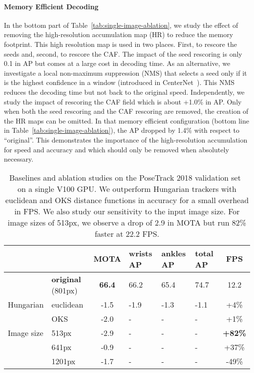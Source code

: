 \documentclass[journal]{IEEEtran}
\begin{document}
\paragraph{Memory Efficient Decoding}
In the bottom part of Table~\ref{tab:single-image-ablation}, we study
the effect of removing the high-resolution accumulation map (HR)
to reduce the memory footprint.
This high resolution map is used in two places. First, to rescore the seeds
and, second, to rescore the CAF. The impact of the seed rescoring
is only 0.1 in AP but comes at a large cost in decoding time.
As an alternative, we investigate a local non-maximum suppression (NMS)
that selects a seed only if it is the highest confidence in a 
window (introduced in CenterNet~\cite{zhou2019objects}). This NMS reduces
the decoding time but not back to the original speed.
Independently, we study the
impact of rescoring the CAF field which is about +1.0\% in AP. Only
when both the seed rescoring and the CAF rescoring are removed, the
creation of the HR maps can be omitted. In that memory efficient
configuration (bottom line in Table~\ref{tab:single-image-ablation}),
the AP dropped by 1.4\% with respect to ``original''. This demonstrates
the importance of the high-resolution accumulation for speed and accuracy
and which should only be removed when absolutely necessary.


\begin{table}
  \centering
  \caption{
    Baselines and ablation studies on the PoseTrack 2018 validation set~\cite{andriluka2018posetrack} on a single V100 GPU.
    We outperform Hungarian trackers with euclidean and
    OKS distance functions in accuracy for a small overhead in FPS.
    We also study our sensitivity to the input image size. For image sizes of 513px, we observe a drop of 2.9 in MOTA
    but run 82\% faster at 22.2 FPS.
}
  \label{tab:posetrack-result2018val}
  \begin{tabular}{|l l|c H H H c|}
    \hline
       & & \textbf{MOTA} & wrists AP & ankles AP & total AP & FPS \\
    \hline\hline
    & \textbf{original} (801px)    & \textbf{66.4} & 66.2     & 65.4     & 74.7     & 12.2 \\

    \hline

    Hungarian
    & euclidean  & -1.5 & -1.9 & -1.3 & -1.1 & +4\% \\
    & OKS        & -2.0 & -    & -   & -   & +1\% \\

    \hline

    Image size
    & 513px          & -2.9 & -   & -   & -   & \textbf{+82\%} \\
    & 641px          & -0.9 & -   & -   & -   & +37\% \\
    & 1201px         & -1.7 & -   & -   & -   & -49\% \\

    \hline
  \end{tabular}
\end{table}
\end{document}
